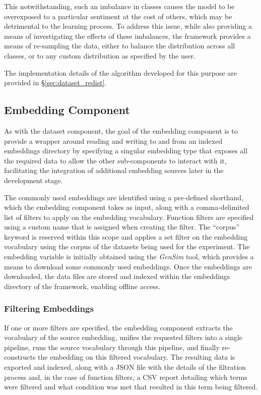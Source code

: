 \documentclass[12pt, a4paper]{report}
\theoremstyle{definition}
\theoremstyle{definition}%
\theoremstyle{definition}%
\theoremstyle{definition}%
\theoremstyle{definition}%
\theoremstyle{definition}%
\begin{document}
This notwithstanding, such an imbalance in classes causes the model to be overexposed to a particular sentiment at the cost of others, which may be detrimental to the learning process. To address this issue, while also providing a means of investigating the effects of these imbalances, the framework provides a means of re-sampling the data, either to balance the distribution across all classes, or to any custom distribution as specified by the user.

The implementation details of the algorithm developed for this purpose are provided in \S\ref{sec:dataset_redist}.

\subsection{Embedding Component}
As with the dataset component, the goal of the embedding component is to provide a wrapper around reading and writing to and from an indexed embeddings directory by specifying a singular embedding type that exposes all the required data to allow the other sub-components to interact with it, facilitating the integration of additional embedding sources later in the development stage.

The commonly used embeddings are identified using a pre-defined shorthand, which the embedding component takes as input, along with a comma-delimited list of filters to apply on the embedding vocabulary. Function filters are specified using a custom name that is assigned when creating the filter. The \enquote{corpus} keyword is reserved within this scope and applies a set filter on the embedding vocabulary using the corpus of the datasets being used for the experiment. The embedding variable is initially obtained using the \textit{GenSim} tool, which provides a means to download some commonly used embeddings. Once the embeddings are downloaded, the data files are stored and indexed within the embeddings directory of the framework, enabling offline access.

\subsubsection{Filtering Embeddings}
If one or more filters are specified, the embedding component extracts the vocabulary of the source embedding, unifies the requested filters into a single pipeline, runs the source vocabulary through this pipeline, and finally re-constructs the embedding on this filtered vocabulary. The resulting data is exported and indexed, along with a JSON file with the details of the filtration process and, in the case of function filters, a CSV report detailing which terms were filtered and what condition was met that resulted in this term being filtered.
\end{document}
